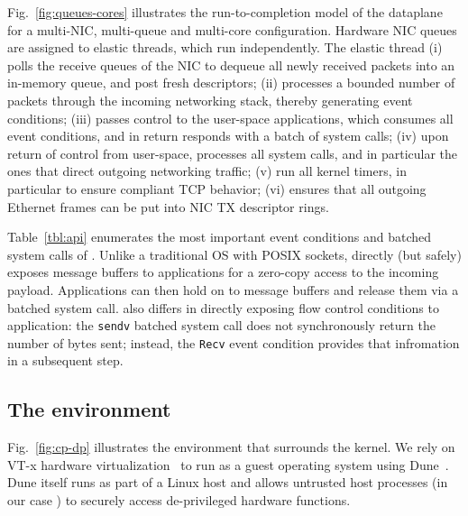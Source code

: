 Fig.~\ref{fig:queues-cores} illustrates the run-to-completion model of the
dataplane for a multi-NIC, multi-queue and multi-core configuration.
Hardware NIC queues are assigned to elastic threads, which run
independently.  The elastic thread (i) polls the receive queues of the
NIC to dequeue all newly received packets into an in-memory queue, and
post fresh descriptors; 
 (ii) processes a bounded number of packets
through the incoming networking stack, thereby generating event
conditions; (iii) passes control to the user-space applications, which
consumes all event conditions, and in return responds with a batch of
system calls; (iv) upon return of control from user-space, \ix
processes all system calls, and in particular the ones that direct
outgoing networking traffic; (v) run all kernel timers, in particular
to ensure compliant TCP behavior; (vi) ensures that all outgoing
Ethernet frames can be put into NIC TX descriptor rings.

Table~\ref{tbl:api} enumerates the most important event conditions and
batched system calls of \ix.  Unlike a traditional OS with POSIX
sockets, \ix directly (but safely) exposes message buffers to
applications for a zero-copy access to the incoming payload.
Applications can then hold on to message buffers and release them via
a batched system call.  \ix also differs in directly exposing flow
control conditions to application: the \texttt{sendv} batched system
call does not synchronously return the number of bytes sent; instead,
the \texttt{Recv} event condition provides that infromation in a
subsequent step.



\subsection{The environment}
\label{sec:impl:env}



Fig.~\ref{fig:cp-dp} illustrates the environment that surrounds the
\ix kernel.  We rely on VT-x hardware
virtualization~\cite{DBLP:journals/computer/UhligNRSMABKLS05} to run
\ix as a guest operating system using Dune~\cite{belay2012dune}. Dune
itself runs as part of a Linux host and allows untrusted host
processes (in our case \ix) to securely access de-privileged hardware
functions.

